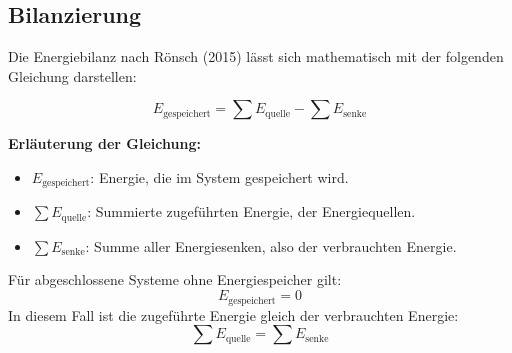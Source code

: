 \subsection{Bilanzierung}
Die Energiebilanz nach Rönsch (2015) lässt sich mathematisch mit der folgenden Gleichung darstellen:

\[
E_{\text{gespeichert}} = \sum E_{\text{quelle}} - \sum E_{\text{senke}}
\]

\textbf{Erläuterung der Gleichung:}
\begin{itemize}
    \item \(E_{\text{gespeichert}}\): Energie, die im System gespeichert wird.
    \item \(\sum E_{\text{quelle}}\): Summierte zugeführten Energie, der Energiequellen.
    \item \(\sum E_{\text{senke}}\): Summe aller Energiesenken, also der verbrauchten Energie.
\end{itemize}

Für abgeschlossene Systeme ohne Energiespeicher gilt:
\[
E_{\text{gespeichert}} = 0
\]
In diesem Fall ist die zugeführte Energie gleich der verbrauchten Energie:
\[
\sum E_{\text{quelle}} = \sum E_{\text{senke}}
\]